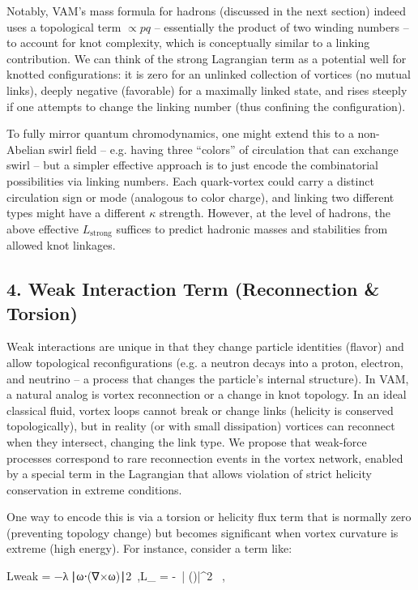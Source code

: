 Notably, VAM’s mass formula for hadrons (discussed in the next section) indeed uses a topological term $\propto p q$ – essentially the product of two winding numbers – to account for knot complexity, which is conceptually similar to a linking contribution. We can think of the strong Lagrangian term as a potential well for knotted configurations: it is zero for an unlinked collection of vortices (no mutual links), deeply negative (favorable) for a maximally linked state, and rises steeply if one attempts to change the linking number (thus confining the configuration).


To fully mirror quantum chromodynamics, one might extend this to a non-Abelian swirl field – e.g. having three “colors” of circulation that can exchange swirl – but a simpler effective approach is to just encode the combinatorial possibilities via linking numbers. Each quark-vortex could carry a distinct circulation sign or mode (analogous to color charge), and linking two different types might have a different $\kappa$ strength. However, at the level of hadrons, the above effective $L_{\text{strong}}$ suffices to predict hadronic masses and stabilities from allowed knot linkages.


\subsection*{4. Weak Interaction Term (Reconnection & Torsion)}

Weak interactions are unique in that they change particle identities (flavor) and allow topological reconfigurations (e.g. a neutron decays into a proton, electron, and neutrino – a process that changes the particle’s internal structure). In VAM, a natural analog is vortex reconnection or a change in knot topology. In an ideal classical fluid, vortex loops cannot break or change links (helicity is conserved topologically), but in reality (or with small dissipation) vortices can reconnect when they intersect, changing the link type. We propose that weak-force processes correspond to rare reconnection events in the vortex network, enabled by a special term in the Lagrangian that allows violation of strict helicity conservation in extreme conditions.


One way to encode this is via a torsion or helicity flux term that is normally zero (preventing topology change) but becomes significant when vortex curvature is extreme (high energy). For instance, consider a term like:

Lweak  =  −λ ∣ω⋅(∇×ω)∣2 ,L_{} \;=\; -\lambda \, |\mathbf{\omega} \cdot (\nabla \times \mathbf{\omega})|^2 ~,

